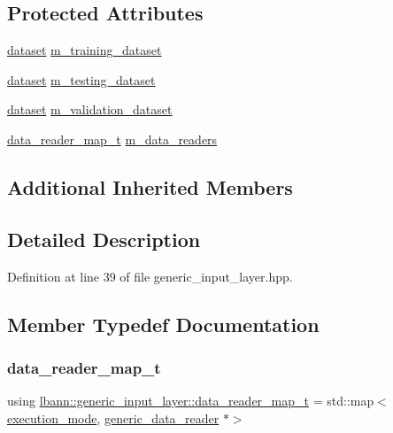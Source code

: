 \subsection*{Protected Attributes}
\begin{DoxyCompactItemize}
\item 
\hyperlink{classlbann_1_1dataset}{dataset} \hyperlink{classlbann_1_1generic__input__layer_a23716635b1062bfe57f7fcf75140a63a}{m\+\_\+training\+\_\+dataset}
\item 
\hyperlink{classlbann_1_1dataset}{dataset} \hyperlink{classlbann_1_1generic__input__layer_a66b9ec6b393695232bd98edc62fc1348}{m\+\_\+testing\+\_\+dataset}
\item 
\hyperlink{classlbann_1_1dataset}{dataset} \hyperlink{classlbann_1_1generic__input__layer_abd70adf607d1cef87fb6641af77e816d}{m\+\_\+validation\+\_\+dataset}
\item 
\hyperlink{classlbann_1_1generic__input__layer_a6c3b901ea25ff3bba052cb3e14df4f83}{data\+\_\+reader\+\_\+map\+\_\+t} \hyperlink{classlbann_1_1generic__input__layer_a6bc18860c02beed0252ea3cc87bc48d2}{m\+\_\+data\+\_\+readers}
\end{DoxyCompactItemize}
\subsection*{Additional Inherited Members}


\subsection{Detailed Description}


Definition at line 39 of file generic\+\_\+input\+\_\+layer.\+hpp.



\subsection{Member Typedef Documentation}
\mbox{\label{classlbann_1_1generic__input__layer_a6c3b901ea25ff3bba052cb3e14df4f83}} 
\subsubsection{\texorpdfstring{data\+\_\+reader\+\_\+map\+\_\+t}{data\_reader\_map\_t}}
{\footnotesize\ttfamily using \hyperlink{classlbann_1_1generic__input__layer_a6c3b901ea25ff3bba052cb3e14df4f83}{lbann\+::generic\+\_\+input\+\_\+layer\+::data\+\_\+reader\+\_\+map\+\_\+t} =  std\+::map$<$\hyperlink{base_8hpp_a2781a159088df64ed7d47cc91c4dc0a8}{execution\+\_\+mode}, \hyperlink{classlbann_1_1generic__data__reader}{generic\+\_\+data\+\_\+reader} $\ast$$>$}




